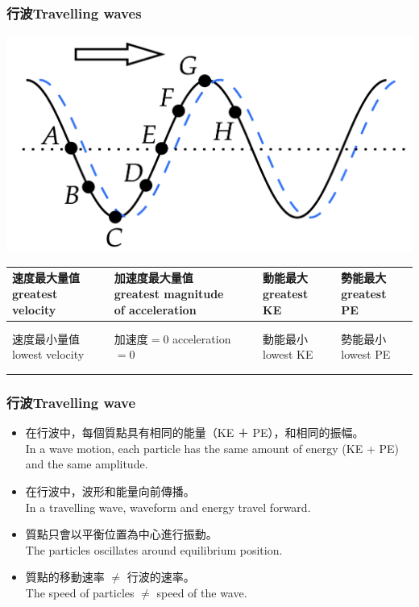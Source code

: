 \documentclass[beamer=true]{standalone}
\begin{document}
\begin{frame}
    \frametitle{行波Travelling waves}
    \par{\par\centering\includegraphics[width=.5\textwidth]{./img/ch1_2024-05-09-15-04-33.png}\par}
    \begin{table}[]
        \begin{tabular}{l|l|l|l}
            \makecell{速度最大量值 \\greatest velocity} & \makecell{加速度最大量值\\greatest magnitude\\of acceleration}   & \makecell{動能最大\\greatest KE} & \makecell{勢能最大\\greatest PE} \\
            \hline
             &  &  &         \\
             &  &  &         \\
            \hline
            \makecell{速度最小量值 \\lowest velocity} & \makecell{加速度$=0$\\acceleration $=0$} & \makecell{動能最小\\lowest KE} & \makecell{勢能最小\\lowest PE} \\
            \hline
             &  &  &         \\
             &  &  &         \\
        \end{tabular}
    \end{table}
\end{frame}

\begin{frame}
    \frametitle{行波Travelling wave}
    \begin{itemize}
        \item 在行波中，每個質點具有相同的能量（KE ＋ PE），和相同的振幅。\\In a wave motion, each particle has the same amount of energy (KE + PE) and the same amplitude.
        \item 在行波中，波形和能量向前傳播。\\In a travelling wave, waveform and energy travel forward.
        \item 質點只會以平衡位置為中心進行振動。\\ The particles oscillates around equilibrium position.
        \item 質點的移動速率 $\neq$ 行波的速率。\\ The speed of particles $\neq$ speed of the wave.
    \end{itemize}


\end{frame}
\end{document}
